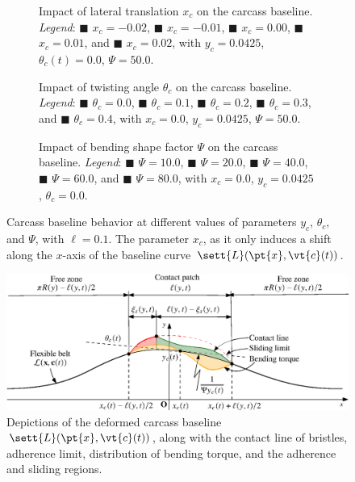 \begin{figure}
  \centering
  \begin{subfigure}[c]{0.3\textwidth}
    \centering
    \caption{Impact of lateral translation $x_c$ on the carcass baseline. \emph{Legend}: \textcolor{mycolor1}{$\blacksquare$} $x_c = -0.02$, \textcolor{mycolor2}{$\blacksquare$} $x_c = -0.01$, \textcolor{mycolor3}{$\blacksquare$} $x_c = 0.00$, \textcolor{mycolor4}{$\blacksquare$} $x_c = 0.01$, and \textcolor{mycolor5}{$\blacksquare$} $x_c = 0.02$, with $y_c = 0.0425$, $\theta_c(t) = 0.0$, $\Psi = 50.0$.}
  \end{subfigure}%
  \hfill
  \begin{subfigure}[c]{0.3\textwidth}
    \centering
    \caption{Impact of twisting angle $\theta_c$ on the carcass baseline. \emph{Legend}: \textcolor{mycolor1}{$\blacksquare$} $\theta_c = 0.0$, \textcolor{mycolor2}{$\blacksquare$} $\theta_c = 0.1$, \textcolor{mycolor3}{$\blacksquare$} $\theta_c = 0.2$, \textcolor{mycolor4}{$\blacksquare$} $\theta_c = 0.3$, and \textcolor{mycolor5}{$\blacksquare$} $\theta_c = 0.4$, with $x_c = 0.0$, $y_c = 0.0425$, $\Psi = 50.0$.}
  \end{subfigure}%
  \hfill
  \begin{subfigure}[c]{0.3\textwidth}
    \centering
    \caption{Impact of bending shape factor $\Psi$ on the carcass baseline. \emph{Legend}: \textcolor{mycolor1}{$\blacksquare$} $\Psi = 10.0$, \textcolor{mycolor2}{$\blacksquare$} $\Psi = 20.0$, \textcolor{mycolor3}{$\blacksquare$} $\Psi = 40.0$, \textcolor{mycolor4}{$\blacksquare$} $\Psi = 60.0$, and \textcolor{mycolor5}{$\blacksquare$} $\Psi = 80.0$, with $x_c = 0.0$, $y_c = 0.0425$, $\theta_c = 0.0$.}
  \end{subfigure}
  \caption{Carcass baseline behavior at different values of parameters $y_c$, $\theta_c$, and $\Psi$, with $\ell = 0.1$. The parameter $x_c$, as it only induces a shift along the $x$-axis of the baseline curve $\sett{L}(\pt{x}, \vt{c}(t))$.}
  \label{chap4:fig:base_carcass}
\end{figure}

\begin{figure}
  \centering
  \includegraphics[width=0.8\linewidth]{./figures/chapter_4/contact_patch}
  \caption{Depictions of the deformed carcass baseline $\sett{L}(\pt{x}, \vt{c}(t))$, along with the contact line of bristles, adherence limit, distribution of bending torque, and the adherence and sliding regions.}
  \label{chap4:fig:contact_patch}
\end{figure}

